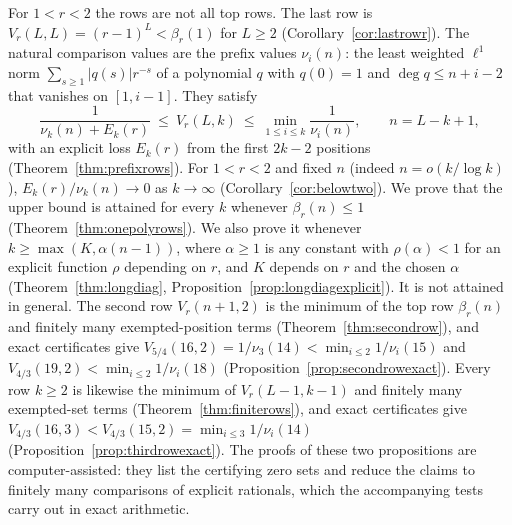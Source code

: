 \documentclass[11pt]{article}
\begin{document}
For $1<r<2$ the rows are not all top rows.  The last row is
$V_r(L,L)=(r-1)^L<\beta_r(1)$ for $L\ge2$ (Corollary~\ref{cor:lastrowr}).
The natural comparison values are the prefix values $\nu_i(n)$: the least
weighted $\ell^1$ norm $\sum_{s\ge1}|q(s)|r^{-s}$ of a polynomial $q$ with
$q(0)=1$ and $\deg q\le n+i-2$ that vanishes on $[1,i-1]$.  They satisfy
\[
  \frac1{\nu_k(n)+E_k(r)}\ \le\ V_r(L,k)\ \le\ \min_{1\le i\le k}\frac1{\nu_i(n)},
  \qquad n=L-k+1,
\]
with an explicit loss $E_k(r)$ from the first $2k-2$ positions
(Theorem~\ref{thm:prefixrows}).  For $1<r<2$ and fixed $n$ (indeed
$n=o(k/\log k)$), $E_k(r)/\nu_k(n)\to0$ as $k\to\infty$
(Corollary~\ref{cor:belowtwo}).
We prove that the upper bound is attained for
every $k$ whenever $\beta_r(n)\le1$ (Theorem~\ref{thm:onepolyrows}).  We
also prove it whenever $k\ge\max(K,\alpha(n-1))$, where $\alpha\ge1$ is any
constant with $\rho(\alpha)<1$ for an explicit function $\rho$ depending on
$r$, and $K$ depends on $r$ and the chosen $\alpha$
(Theorem~\ref{thm:longdiag}, Proposition~\ref{prop:longdiagexplicit}).
It is not attained in general.  The second row $V_r(n+1,2)$ is the minimum of the top
row $\beta_r(n)$ and finitely many exempted-position terms (Theorem~\ref{thm:secondrow}), and exact
certificates give $V_{5/4}(16,2)=1/\nu_3(14)<\min_{i\le2}1/\nu_i(15)$ and
$V_{4/3}(19,2)<\min_{i\le2}1/\nu_i(18)$
(Proposition~\ref{prop:secondrowexact}).  Every row $k\ge2$ is likewise
the minimum of $V_r(L-1,k-1)$ and finitely many exempted-set terms
(Theorem~\ref{thm:finiterows}), and exact certificates give
$V_{4/3}(16,3)<V_{4/3}(15,2)=\min_{i\le3}1/\nu_i(14)$
(Proposition~\ref{prop:thirdrowexact}).  The proofs of these two
propositions are computer-assisted: they list the certifying zero sets and
reduce the claims to finitely many comparisons of explicit rationals, which
the accompanying tests carry out in exact arithmetic.
\end{document}
